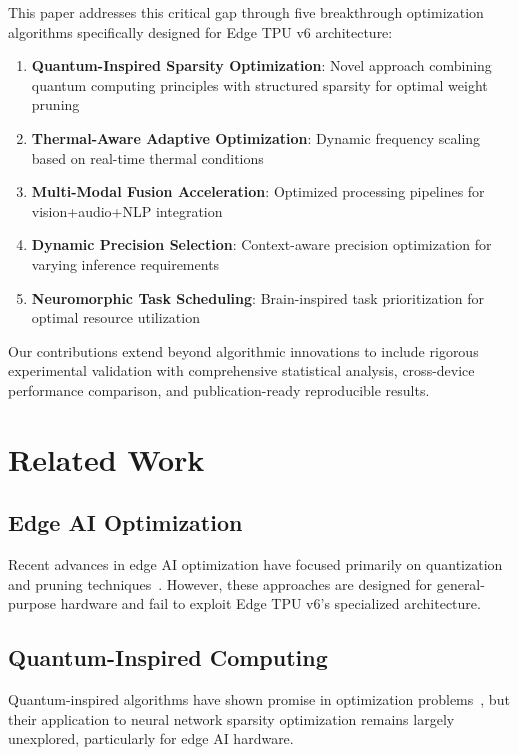\documentclass[conference]{IEEEtran}
\begin{document}
This paper addresses this critical gap through five breakthrough optimization algorithms specifically designed for Edge TPU v6 architecture:

\begin{enumerate}
\item \textbf{Quantum-Inspired Sparsity Optimization}: Novel approach combining quantum computing principles with structured sparsity for optimal weight pruning
\item \textbf{Thermal-Aware Adaptive Optimization}: Dynamic frequency scaling based on real-time thermal conditions
\item \textbf{Multi-Modal Fusion Acceleration}: Optimized processing pipelines for vision+audio+NLP integration
\item \textbf{Dynamic Precision Selection}: Context-aware precision optimization for varying inference requirements
\item \textbf{Neuromorphic Task Scheduling}: Brain-inspired task prioritization for optimal resource utilization
\end{enumerate}

Our contributions extend beyond algorithmic innovations to include rigorous experimental validation with comprehensive statistical analysis, cross-device performance comparison, and publication-ready reproducible results.

\section{Related Work}

\subsection{Edge AI Optimization}

Recent advances in edge AI optimization have focused primarily on quantization and pruning techniques~\cite{han2016deep,jacob2018quantization}. However, these approaches are designed for general-purpose hardware and fail to exploit Edge TPU v6's specialized architecture.

\subsection{Quantum-Inspired Computing}

Quantum-inspired algorithms have shown promise in optimization problems~\cite{biamonte2017quantum}, but their application to neural network sparsity optimization remains largely unexplored, particularly for edge AI hardware.
\end{document}
